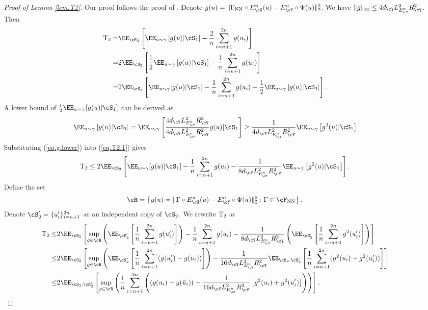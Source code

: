 \documentclass[11pt]{article} %
\begin{document}
\begin{proof}[Proof of Lemma \ref{lem.T2}]
	Our proof follows the proof of \citep[Lemma 4.2]{chen2019nonparametric}. Denote $g(u)= \|\Gamma_{\rm NN} \circ E_{\cX}^n(u)- E_{\cY}^n\circ\Psi(u)\|^2_2$. We have $\|g\|_{\infty}\leq 4d_{\cY}L_{E^n_{\cY}}^2R_{\cY}^2$. Then
	\begin{align}
		{\rm T_2}=&\EE_{\cS_2}\left[\EE_{u\sim \gamma}\left[g(u)|\cS_1\right]-\frac{2}{n}\sum_{i=n+1}^{2n} g(u_i)\right]\nonumber\\
		=&2\EE_{\cS_2}\left[\frac{1}{2}\EE_{u\sim \gamma}\left[g(u)|\cS_1\right]-\frac{1}{n}\sum_{i=n+1}^{2n} g(u_i)\right]\nonumber\\
		=&2\EE_{\cS_2}\left[\EE_{u\sim \gamma}[g(u)|\cS_1]-\frac{1}{n}\sum_{i=n+1}^{2n} g(u_i)-\frac{1}{2}\EE_{u\sim \gamma}\left[g(u)|\cS_1\right]\right].
		\label{eq.T2.1}
	\end{align}
	A lower bound of $\frac{1}{2}\EE_{u\sim \gamma}\left[g(u)|\cS_1\right]$ can be derived as
	\begin{align}
		\EE_{u\sim \gamma}\left[g(u)|\cS_1\right]= \EE_{u\sim \gamma}\left[\frac{4d_{\cY}L_{E^n_{\cY}}^2R_{\cY}^2}{4d_{\cY}L_{E^n_{\cY}}^2R_{\cY}^2}g(u)|\cS_1\right]
		\geq  \frac{1}{4d_{\cY}L_{E^n_{\cY}}^2R_{\cY}^2}\EE_{u\sim \gamma}\left[g^2(u)|\cS_1\right]
		\label{eq.g.lower}
	\end{align}
	Substituting (\ref{eq.g.lower}) into (\ref{eq.T2.1}) gives
	\begin{align}
		{\rm T_2}\leq 2\EE_{\cS_2}\left[\EE_{u\sim \gamma}[g(u)|\cS_1]-\frac{1}{n}\sum_{i=n+1}^{2n} g(u_i)-\frac{1}{8d_{\cY}L_{E^n_{\cY}}^2R_{\cY}^2}\EE_{u\sim \gamma}\left[g^2(u)|\cS_1\right]\right].
	\end{align}
	Define the set
	\begin{align}
		\cR=\left\{ g(u)=\|\Gamma \circ E_{\cX}^n(u)- E_{\cY}^n\circ\Psi(u)\|^2_2: \Gamma\in \cF_{\rm NN}\right\}.
	\end{align}
	Denote $\cS_2'=\{u'_i\}_{i=n+1}^{2n}$  as an independent copy of $\cS_2$. We rewrite ${\rm T_2}$ as
	\begin{align}
		{\rm T_2}\leq& 2\EE_{\cS_2}\left[\sup_{g\in \cR}\left(\EE_{\cS_2'}\left[\frac{1}{n}\sum_{i=n+1}^{2n} g(u'_i)\right]\right)-\frac{1}{n}\sum_{i=n+1}^{2n} g(u_i)-\frac{1}{8d_{\cY}L_{E^n_{\cY}}^2R_{\cY}^2}\left(\EE_{\cS_2'}\left[\frac{1}{n}\sum_{i=n+1}^{2n} g^2(u'_i)\right]\right)\right]\nonumber\\
		\leq &2\EE_{\cS_2}\left[\sup_{g\in \cR}\left(\EE_{\cS_2'}\left[\frac{1}{n}\sum_{i=n+1}^{2n} (g(u'_i)-g(u_i))\right]\right)-\frac{1}{16d_{\cY}L_{E^n_{\cY}}^2R_{\cY}^2}\EE_{\cS_2,\cS'_2}\left[\frac{1}{n}\sum_{i=n+1}^{2n} (g^2(u_i)+g^2(u'_i))\right]\right]\nonumber\\
		\leq & 2\EE_{\cS_2,\cS'_2}\left[\sup_{g\in \cR}\left(\frac{1}{n}\sum_{i=n+1}^{2n} \left((g(u_i)-g(\bar{u}_i))-\frac{1}{16d_{\cY}L_{E^n_{\cY}}^2R_{\cY}^2}\left[g^2(u_i)+g^2(u'_i)\right]\right)\right)\right].
		\label{eq.T2.2}
	\end{align}
	

\end{proof}
\end{document}
